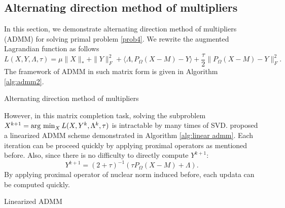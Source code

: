 \documentclass{article}
\begin{document}
\subsection{Alternating direction method of multipliers}
In this section, we demonstrate alternating direction method of multipliers (ADMM) for solving primal problem \eqref{prob4}. We rewrite the augmented Lagrandian function as follows 
\begin{equation}\label{alm:lowrank}
	L(X,Y,\Lambda,\tau) = \mu\|X\|_*+\|Y\|_F^2+\langle \Lambda,P_\Omega(X-M)-Y\rangle +\frac{\tau}{2} \|P_\Omega(X-M)-Y\|_F^2.
\end{equation}
The framework of ADMM in such matrix form is given in Algorithm \ref{alg:admm2}.
\begin{algorithm}[H]
	\caption{Alternating direction method of multipliers}
	\begin{algorithmic}[1]\label{alg:admm2}
	\ENDWHILE
	\end{algorithmic}
	\end{algorithm}
However, in this matrix completion task, solving the subproblem $X^{k+1}=\operatorname{arg~min}_XL(X,Y^k,\Lambda^k,\tau)$ is intractable by many times of SVD. \cite{yang2011alternating} proposed a linearized ADMM scheme demonstrated in Algorithm \ref{alg:linear admm}. Each iteration can be proceed quickly by applying proximal operators as mentioned before. Also, since there is no difficulty to directly compute $Y^{k+1}$:
\begin{equation}
	Y^{k+1} = (2+\tau)^{-1}(\tau P_\Omega(X-M)+\Lambda).
\end{equation}
By applying proximal operator of nuclear norm induced before, each updata can be computed quickly.
\begin{algorithm}[H]
	\caption{Linearized ADMM}
	\begin{algorithmic}[1]\label{alg:linear admm2}
	\ENDWHILE
	\end{algorithmic}
	\end{algorithm}
\end{document}

